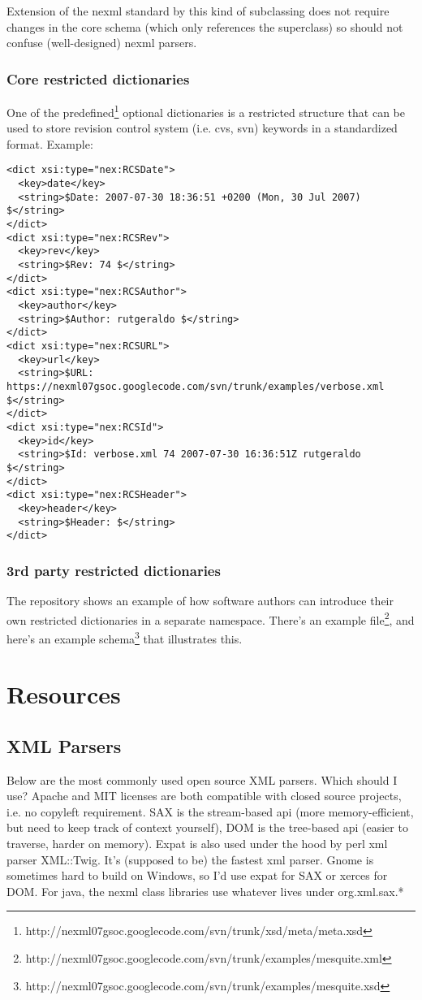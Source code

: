 \documentclass{article}
\begin{document}
Extension of the nexml standard by this kind of subclassing does not require changes in the core schema (which only references the 
superclass) so should not confuse (well-designed) nexml parsers.

\subsubsection{Core restricted dictionaries}
One of the predefined\footnote{http://nexml07gsoc.googlecode.com/svn/trunk/xsd/meta/meta.xsd} optional dictionaries is a 
restricted structure that can be used to store revision control system (i.e. cvs, svn) keywords in a standardized format. Example:
\begin{verbatim}
<dict xsi:type="nex:RCSDate">
  <key>date</key>
  <string>$Date: 2007-07-30 18:36:51 +0200 (Mon, 30 Jul 2007) $</string>
</dict>
<dict xsi:type="nex:RCSRev">
  <key>rev</key>
  <string>$Rev: 74 $</string>
</dict>
<dict xsi:type="nex:RCSAuthor">
  <key>author</key>
  <string>$Author: rutgeraldo $</string>
</dict>
<dict xsi:type="nex:RCSURL">
  <key>url</key>
  <string>$URL: https://nexml07gsoc.googlecode.com/svn/trunk/examples/verbose.xml $</string>
</dict>
<dict xsi:type="nex:RCSId">
  <key>id</key>
  <string>$Id: verbose.xml 74 2007-07-30 16:36:51Z rutgeraldo $</string>
</dict>
<dict xsi:type="nex:RCSHeader">
  <key>header</key>
  <string>$Header: $</string>
</dict>
\end{verbatim}

\subsubsection{3rd party restricted dictionaries}

The repository shows an example of how software authors can introduce their own restricted dictionaries in a separate namespace. There's 
an example file\footnote{http://nexml07gsoc.googlecode.com/svn/trunk/examples/mesquite.xml}, and here's an 
example schema\footnote{http://nexml07gsoc.googlecode.com/svn/trunk/examples/mesquite.xsd} that illustrates this.

\section{Resources}

\subsection{XML Parsers}
Below are the most commonly used open source XML parsers. Which should I use? Apache and MIT licenses are both compatible with 
closed source projects, i.e. no copyleft requirement. SAX is the stream-based api (more memory-efficient, but need to keep track 
of context yourself), DOM is the tree-based api (easier to traverse, harder on memory). Expat is also used under the hood by perl 
xml parser XML::Twig. It's (supposed to be) the fastest xml parser. Gnome is sometimes hard to build on Windows, so I'd use expat 
for SAX or xerces for DOM. For java, the nexml class libraries use whatever lives under org.xml.sax.*
\end{document}
